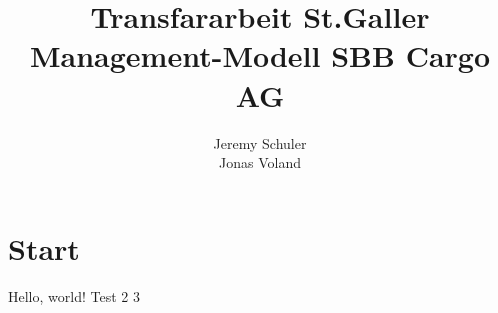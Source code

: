 \documentclass{article}
\title{Transfararbeit St.Galler Management-Modell SBB Cargo AG}
\author{
    Jeremy Schuler\\
    Jonas Voland
}
\begin{document}
\begin{titlepage}
\maketitle
\end{titlepage}

\setcounter{page}{2}

\tableofcontents

\newpage

\section{Start}

Hello, world! Test 2 3
\end{document}
